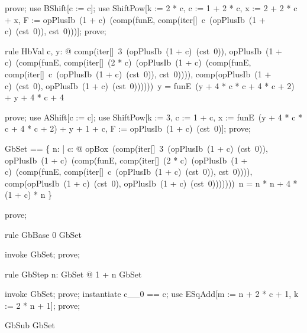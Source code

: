\documentclass{article}
\begin{document}
\begin{zproof}
prove;
use BShift[c := c];
use ShiftPow[k := 2 * c, c := 1 + 2 * c, x := 2 + 2 * c + x, F := opPlusIb~(1 + c)~(comp(funE, comp(iter[\nat]~c~(opPlusIb~(1 + c)~(cst~0)), cst~0)))];
prove;
\end{zproof}

\begin{theorem}{rule HbVal}
  \forall c, y: \nat @ comp(iter[\nat]~3~(opPlusIb~(1 + c)~(cst~0)), opPlusIb~(1 + c)~(comp(funE, comp(iter[\nat]~(2 * c)~(opPlusIb~(1 + c)~(comp(funE, comp(iter[\nat]~c~(opPlusIb~(1 + c)~(cst~0)), cst~0)))), comp(opPlusIb~(1 + c)~(cst~0), opPlusIb~(1 + c)~(cst~0))))))~y = funE~(y + 4 * c * c + 4 * c + 2) + y + 4 * c + 4
\end{theorem}

\begin{zproof}
prove;
use AShift[c := c];
use ShiftPow[k := 3, c := 1 + c, x := funE~(y + 4 * c * c + 4 * c + 2) + y + 1 + c, F := opPlusIb~(1 + c)~(cst~0)];
prove;
\end{zproof}

\begin{zed}
  GbSet == \{ n: \nat | \forall c: \nat @ opBox~(comp(iter[\nat]~3~(opPlusIb~(1 + c)~(cst~0)), opPlusIb~(1 + c)~(comp(funE, comp(iter[\nat]~(2 * c)~(opPlusIb~(1 + c)~(comp(funE, comp(iter[\nat]~c~(opPlusIb~(1 + c)~(cst~0)), cst~0)))), comp(opPlusIb~(1 + c)~(cst~0), opPlusIb~(1 + c)~(cst~0)))))))~n = n * n + 4 * (1 + c) * n \}
\end{zed}

\begin{zproof}
prove;
\end{zproof}

\begin{theorem}{rule GbBase}
  0 \in GbSet
\end{theorem}

\begin{zproof}
invoke GbSet;
prove;
\end{zproof}

\begin{theorem}{rule GbStep}
  \forall n: GbSet @ 1 + n \in GbSet
\end{theorem}

\begin{zproof}
invoke GbSet;
prove;
instantiate c\_\_0 == c;
use ESqAdd[m := n + 2 * c + 1, k := 2 * n + 1];
prove;
\end{zproof}

\begin{theorem}{GbSub}
  \nat \subseteq GbSet
\end{theorem}
\end{document}
